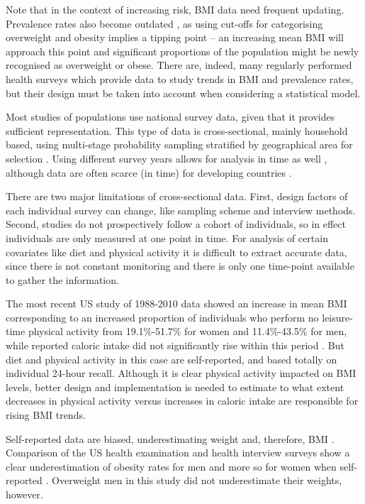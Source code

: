 \documentclass[12pt,a4paper]{article}
\begin{document}
Note that in the context of increasing risk, BMI data need frequent updating. Prevalence rates also become outdated \citep{prentice06}, as using cut-offs for categorising overweight and obesity implies a tipping point -- an increasing mean BMI will approach this point and significant proportions of the population might be newly recognised as overweight or obese. There are, indeed, many regularly performed health surveys which provide data to study trends in BMI and prevalence rates, but their design must be taken into account when considering a statistical model.  





								
Most studies of populations use national survey data, given that it provides sufficient representation. This type of data is cross-sectional, mainly household based, using multi-stage probability sampling stratified by geographical area for selection \citep{oecd}. Using different survey years allows for analysis in time as well \citep{ladabaum2014, stevens11}, although data are often scarce (in time) for developing countries \citep{prentice06}. 
 
There are two major limitations of cross-sectional data. First, design factors of each individual survey can change, like sampling scheme and interview methods. Second, studies do not prospectively follow a cohort of individuals, so in effect individuals are only measured at one point in time. For analysis of certain covariates like diet and physical activity it is difficult to extract accurate data, since there is not constant monitoring and there is only one time-point available to gather the information. 

The most recent US study of 1988-2010 data showed an increase in mean BMI corresponding to an increased proportion of individuals who perform no leisure-time physical activity from 19.1\%-51.7\% for women and 11.4\%-43.5\% for men, while reported caloric intake did not significantly rise within this period \citep{ladabaum2014}. But diet and physical activity in this case are self-reported, and based totally on individual 24-hour recall. Although it is clear physical activity impacted on BMI levels, better design and implementation is needed to estimate to what extent decreases in physical activity versus increases in caloric intake are responsible for rising BMI trends.

Self-reported data are biased, underestimating weight and, therefore, BMI \citep{stevens11}. Comparison of the US health examination and health interview surveys show a clear underestimation of obesity rates for men and more so for women when self-reported \citep{oecd}. Overweight men in this study did not underestimate their weights, however.
\end{document}
